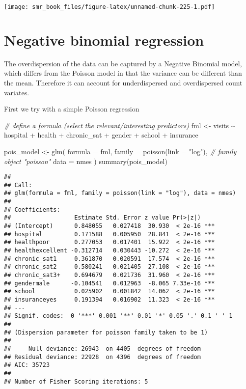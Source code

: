 \documentclass[
  oneside]{book}
\newenvironment{Shaded}{\begin{snugshade}}{\end{snugshade}}
\newcommand{\AttributeTok}[1]{\textcolor[rgb]{0.77,0.63,0.00}{#1}}
\newcommand{\CommentTok}[1]{\textcolor[rgb]{0.56,0.35,0.01}{\textit{#1}}}
\newcommand{\FunctionTok}[1]{\textcolor[rgb]{0.00,0.00,0.00}{#1}}
\newcommand{\NormalTok}[1]{#1}
\newcommand{\OtherTok}[1]{\textcolor[rgb]{0.56,0.35,0.01}{#1}}
\newcommand{\SpecialCharTok}[1]{\textcolor[rgb]{0.00,0.00,0.00}{#1}}
\newcommand{\StringTok}[1]{\textcolor[rgb]{0.31,0.60,0.02}{#1}}
\begin{document}
\texttt{[image: smr\_book\_files/figure-latex/unnamed-chunk-225-1.pdf]}

\hypertarget{negative-binomial-regression}{%
\section{Negative binomial regression}\label{negative-binomial-regression}}

The overdispersion of the data can be captured by a Negative Binomial
model, which differs from the Poisson model in that the variance can
be different than the mean. Therefore it can account for underdispersed and
overdispersed count variates.

First we try with a simple Poisson regression

\begin{Shaded}
\begin{Highlighting}[]
\CommentTok{\# define a formula (select the relevant/interesting predictors)}
\NormalTok{fml }\OtherTok{\textless{}{-}}\NormalTok{ visits }\SpecialCharTok{\textasciitilde{}}\NormalTok{ hospital }\SpecialCharTok{+}\NormalTok{ health }\SpecialCharTok{+}\NormalTok{ chronic\_sat }\SpecialCharTok{+}\NormalTok{ gender }\SpecialCharTok{+}\NormalTok{ school }\SpecialCharTok{+}\NormalTok{ insurance}

\NormalTok{pois\_model }\OtherTok{\textless{}{-}} \FunctionTok{glm}\NormalTok{(}
  \AttributeTok{formula =}\NormalTok{ fml, }\AttributeTok{family =} \FunctionTok{poisson}\NormalTok{(}\AttributeTok{link =} \StringTok{"log"}\NormalTok{), }\CommentTok{\# family object "poisson"}
  \AttributeTok{data =}\NormalTok{ nmes}
\NormalTok{)}
\FunctionTok{summary}\NormalTok{(pois\_model)}
\end{Highlighting}
\end{Shaded}

\begin{verbatim}
## 
## Call:
## glm(formula = fml, family = poisson(link = "log"), data = nmes)
## 
## Coefficients:
##                  Estimate Std. Error z value Pr(>|z|)    
## (Intercept)      0.848055   0.027418  30.930  < 2e-16 ***
## hospital         0.171588   0.005950  28.841  < 2e-16 ***
## healthpoor       0.277053   0.017401  15.922  < 2e-16 ***
## healthexcellent -0.312714   0.030443 -10.272  < 2e-16 ***
## chronic_sat1     0.361870   0.020591  17.574  < 2e-16 ***
## chronic_sat2     0.580241   0.021405  27.108  < 2e-16 ***
## chronic_sat3+    0.694679   0.021736  31.960  < 2e-16 ***
## gendermale      -0.104541   0.012963  -8.065 7.33e-16 ***
## school           0.025902   0.001842  14.062  < 2e-16 ***
## insuranceyes     0.191394   0.016902  11.323  < 2e-16 ***
## ---
## Signif. codes:  0 '***' 0.001 '**' 0.01 '*' 0.05 '.' 0.1 ' ' 1
## 
## (Dispersion parameter for poisson family taken to be 1)
## 
##     Null deviance: 26943  on 4405  degrees of freedom
## Residual deviance: 22928  on 4396  degrees of freedom
## AIC: 35723
## 
## Number of Fisher Scoring iterations: 5
\end{verbatim}
\end{document}
